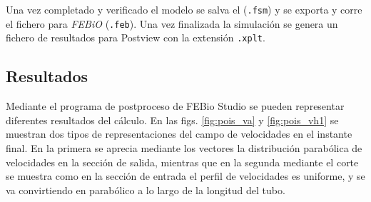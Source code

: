 Una vez completado y verificado el modelo se salva el (\texttt{.fsm}) y se exporta y corre el fichero para \emph{FEBiO} (\texttt{.feb}). Una vez finalizada la simulación se genera un fichero de resultados para Postview con la extensión \texttt{.xplt}.

\subsection{Resultados}

Mediante el programa de postproceso de FEBio Studio se pueden representar diferentes resultados del cálculo.
En las figs. \ref{fig:pois_va} y \ref{fig:pois_vh1} se muestran dos tipos de representaciones del campo de velocidades en el instante final.
En la primera se aprecia mediante los vectores la distribución parabólica de velocidades en la sección de salida, mientras que en la segunda mediante el corte se muestra como en la sección de entrada el perfil de velocidades es uniforme, y se va convirtiendo en parabólico a lo largo de la longitud del tubo.
